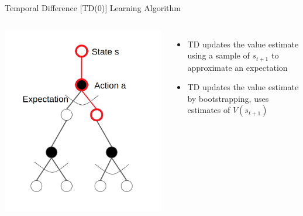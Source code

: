 \documentclass[aspectratio=169]{../latex_main/tntbeamer}  %
\begin{document}
\begin{frame}[c]{Temporal Difference [TD(0)] Learning Algorithm}

\begin{columns}
	
	
	\includegraphics[width=1.0\textwidth]{images/td0.png}
	
	
	\begin{itemize}
		\item TD updates the value estimate using a sample of $s_{t+1}$ to approximate an expectation
		\item TD updates the value estimate by bootstrapping, uses estimates of $V(s_{t+1})$
	\end{itemize}
	
	
\end{columns}	

\end{frame}
\end{document}
